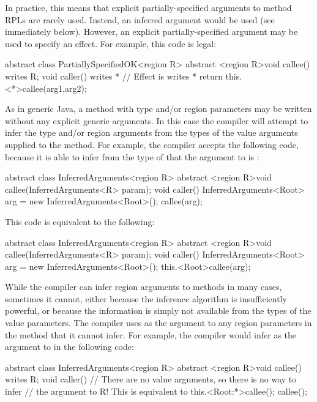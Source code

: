 In practice, this means that explicit partially-specified arguments to
method RPLs are rarely used.  Instead, an inferred argument would be
used (see immediately below).  However, an explicit
partially-specified argument may be used to specify an effect.  For
example, this code is legal:
%
\begin{dpjlisting}
abstract class PartiallySpecifiedOK<region R> {
  abstract <region R>void callee() writes R;
  void caller() 
    writes * 
  {
    // Effect is writes *
    return this.<*>callee(arg1,arg2);
  }
}
\end{dpjlisting}
%


 As in generic Java, a method with type
and/or region parameters may be written without any explicit generic
arguments.  In this case the compiler will attempt to infer the type
and/or region arguments from the types of the value arguments supplied
to the method.  For example, the  compiler accepts the
following code, because it is able to infer from the type
 of  that the argument to
 is :
%
\begin{dpjlisting}
abstract class InferredArguments<region R> {
  abstract <region R>void callee(InferredArguments<R> param);
  void caller() {
    InferredArguments<Root> arg = new InferredArguments<Root>();
    callee(arg);
  }
}
\end{dpjlisting}
%
This code is equivalent to the following:
%
\begin{dpjlisting}
abstract class InferredArguments<region R> {
  abstract <region R>void callee(InferredArguments<R> param);
  void caller() {
    InferredArguments<Root> arg = new InferredArguments<Root>();
    this.<Root>callee(arg);
  }
}
\end{dpjlisting}

While the compiler can infer region arguments to methods in many
cases, sometimes it cannot, either because the inference algorithm is
insufficiently powerful, or because the information is simply not
available from the types of the value parameters.  The compiler uses
 as the argument to any region parameters in the method
that it cannot infer.  For example, the compiler would infer
 as the argument to  in the following code:
%
\begin{dpjlisting}
abstract class InferredArguments<region R> {
  abstract <region R>void callee() writes R;
  void caller() {
    // There are no value arguments, so there is no way to infer
    // the argument to R!  This is equivalent to this.<Root:*>callee();
    callee();
  }
}
\end{dpjlisting}

